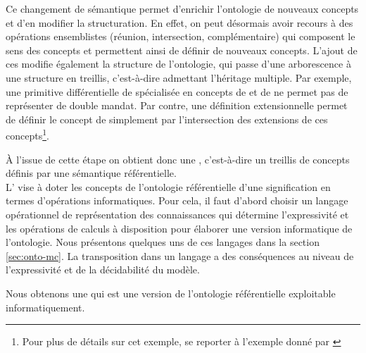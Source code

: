 Ce changement de sémantique permet d'enrichir l'ontologie de nouveaux concepts et d'en modifier la structuration. 
En effet, on peut désormais avoir recours à des opérations ensemblistes (réunion, intersection, complémentaire) qui composent le sens des concepts et permettent ainsi de définir de nouveaux concepts.
L'ajout de ces  modifie également la structure de l'ontologie, qui passe d'une arborescence à une structure en treillis, c'est-à-dire admettant l'héritage multiple. 
Par exemple, une primitive différentielle de  spécialisée en concepts de  et de  ne permet pas de représenter de double mandat.
Par contre, une définition extensionnelle permet de définir le concept de  simplement par l'intersection des extensions de ces concepts\footnote{Pour plus de détails sur cet exemple, se reporter à l'exemple donné par \cite[p.149]{bachimont:icc}}.

À l'issue de cette étape on obtient donc une , c'est-à-dire un treillis de concepts définis par une sémantique référentielle.\\

\g{[3.]} L' vise à doter les concepts de l'ontologie référentielle d'une signification en termes d'opérations informatiques.
Pour cela, il faut d'abord choisir un langage opérationnel de représentation des connaissances qui détermine l'expressivité et les opérations de calculs à disposition pour élaborer une version informatique de l'ontologie.
Nous présentons quelques uns de ces langages dans la section \ref{sec:onto-mc}.
La transposition dans un langage a des conséquences au niveau de l'expressivité et de la décidabilité du modèle.

Nous obtenons une  qui est une version de l'ontologie référentielle exploitable informatiquement.









